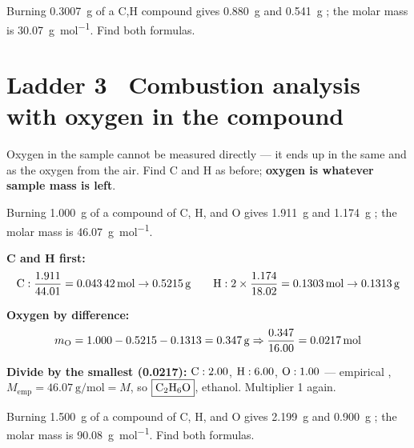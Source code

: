 \documentclass{apchem-worksheet}
\begin{document}
\begin{yourturn}
Burning \SI{0.3007}{\gram} of a C,H compound gives \SI{0.880}{\gram}
 and \SI{0.541}{\gram} ; the molar mass is
\SI{30.07}{\gram\per\mole}. Find both formulas. \workspace[3.6cm]
\end{yourturn}

\section*{\sffamily Ladder 3 \textbullet\ Combustion analysis with oxygen
in the compound}

Oxygen in the sample cannot be measured directly --- it ends up in the
same  and  as the oxygen from the air. Find C and H as
before; \textbf{oxygen is whatever sample mass is left}.

\begin{workedexample}
Burning \SI{1.000}{\gram} of a compound of C, H, and O gives
\SI{1.911}{\gram}  and \SI{1.174}{\gram} ; the molar mass
is \SI{46.07}{\gram\per\mole}.

\textbf{C and H first:}
\[ \ce{C}: \frac{1.911}{44.01} = \SI{0.04342}{\mole} \to \SI{0.5215}{\gram}
   \qquad
   \ce{H}: 2 \times \frac{1.174}{18.02} = \SI{0.1303}{\mole}
   \to \SI{0.1313}{\gram} \]

\textbf{Oxygen by difference:}
\[ m_{\ce{O}} = 1.000 - 0.5215 - 0.1313 = \SI{0.347}{\gram}
   \Rightarrow \frac{0.347}{16.00} = \SI{0.0217}{\mole} \]

\textbf{Divide by the smallest (0.0217):}
$\ce{C}: 2.00$, $\ce{H}: 6.00$, $\ce{O}: 1.00$ --- empirical ,
$M_{\text{emp}} = \SI{46.07}{\gram\per\mole} = M$, so
$\boxed{\ce{C2H6O}}$, ethanol. Multiplier 1 again.
\end{workedexample}

\begin{yourturn}
Burning \SI{1.500}{\gram} of a compound of C, H, and O gives
\SI{2.199}{\gram}  and \SI{0.900}{\gram} ; the molar mass
is \SI{90.08}{\gram\per\mole}. Find both formulas. \workspace[4.2cm]
\end{yourturn}
\end{document}
